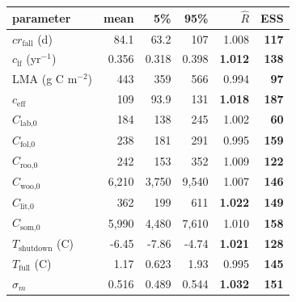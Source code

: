 \begin{tabular}[t]{lrrrrr}
\toprule
parameter & mean & 5\% & 95\% & $\hat R$ & ESS \\
\midrule
$cr_\text{fall}$ (d) & 84.1 & 63.2 & 107 & 1.008 & \textbf{117} \\
$c_\text{lf}$ (yr$^{-1}$) & 0.356 & 0.318 & 0.398 & \textbf{1.012} & \textbf{138} \\
LMA (g C m$^{-2}$) & 443 & 359 & 566 & 0.994 & \textbf{97} \\
$c_\text{eff}$ & 109 & 93.9 & 131 & \textbf{1.018} & \textbf{187} \\
$C_\text{lab,0}$ & 184 & 138 & 245 & 1.002 & \textbf{60} \\
$C_\text{fol,0}$ & 238 & 181 & 291 & 0.995 & \textbf{159} \\
$C_\text{roo,0}$ & 242 & 153 & 352 & 1.009 & \textbf{122} \\
$C_\text{woo,0}$ & 6,210 & 3,750 & 9,540 & 1.007 & \textbf{146} \\
$C_\text{lit,0}$ & 362 & 199 & 611 & \textbf{1.022} & \textbf{149} \\
$C_\text{som,0}$ & 5,990 & 4,480 & 7,610 & 1.010 & \textbf{158} \\
$T_\text{shutdown}$ (\textdegree{}C) & -6.45 & -7.86 & -4.74 & \textbf{1.021} & \textbf{128} \\
$T_\text{full}$ (\textdegree{}C) & 1.17 & 0.623 & 1.93 & 0.995 & \textbf{145} \\
$\sigma_m$ & 0.516 & 0.489 & 0.544 & \textbf{1.032} & \textbf{151} \\
\bottomrule
\end{tabular}

